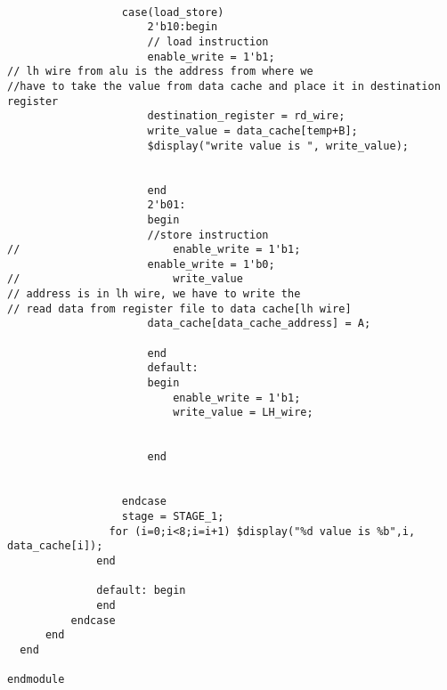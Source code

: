 \begin{lstlisting}
                  
                  case(load_store)
                      2'b10:begin
                      // load instruction
                      enable_write = 1'b1;
// lh wire from alu is the address from where we 
//have to take the value from data cache and place it in destination register
                      destination_register = rd_wire;
                      write_value = data_cache[temp+B];
                      $display("write value is ", write_value);
                      
                      
                      end
                      2'b01:
                      begin
                      //store instruction
//                        enable_write = 1'b1;
                      enable_write = 1'b0;
//                        write_value
// address is in lh wire, we have to write the 
// read data from register file to data cache[lh wire]
                      data_cache[data_cache_address] = A;                        
                      
                      end
                      default:
                      begin
                          enable_write = 1'b1;
                          write_value = LH_wire;
                          
                      
                      end
                      
                      
                  endcase
                  stage = STAGE_1;
                for (i=0;i<8;i=i+1) $display("%d value is %b",i, data_cache[i]);
              end
              
              default: begin
              end
          endcase
      end
  end

endmodule
\end{lstlisting}




